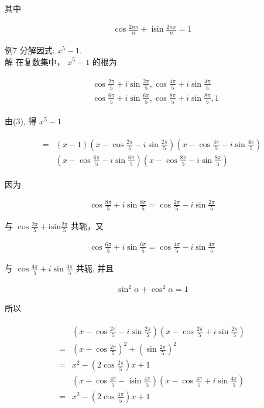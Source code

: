 \documentclass[10pt]{article}
\begin{document}
其中

\begin{align*}
\cos \frac{2 n \pi}{n}+\operatorname{isin} \frac{2 n \pi}{n}=1
\end{align*}

例7 分解因式: $x^{5}-1$.\\
解 在复数集中， $x^{5}-1$ 的根为

\begin{align*}
\begin{aligned}
& \cos \frac{2 \pi}{5}+i \sin \frac{2 \pi}{5}, \cos \frac{4 \pi}{5}+i \sin \frac{4 \pi}{5} \\
& \cos \frac{6 \pi}{5}+i \sin \frac{6 \pi}{5}, \cos \frac{8 \pi}{5}+i \sin \frac{8 \pi}{5}, 1
\end{aligned}
\end{align*}

由(3), 得 $x^{5}-1$

\begin{align*}
\begin{aligned}
= & (x-1)\left(x-\cos \frac{2 \pi}{5}-i \sin \frac{2 \pi}{5}\right)\left(x-\cos \frac{4 \pi}{5}-i \sin \frac{4 \pi}{5}\right) \\
& \left(x-\cos \frac{6 \pi}{5}-i \sin \frac{6 \pi}{5}\right)\left(x-\cos \frac{8 \pi}{5}-i \sin \frac{8 \pi}{5}\right)
\end{aligned}
\end{align*}

因为

\begin{align*}
\cos \frac{8 \pi}{5}+i \sin \frac{8 \pi}{5}=\cos \frac{2 \pi}{5}-i \sin \frac{2 \pi}{5}
\end{align*}

与 $\cos \frac{2 \pi}{5}+\mathrm{isin} \frac{2 \pi}{5}$ 共轭，又

\begin{align*}
\cos \frac{6 \pi}{5}+i \sin \frac{6 \pi}{5}=\cos \frac{4 \pi}{5}-i \sin \frac{4 \pi}{5}
\end{align*}

与 $\cos \frac{4 \pi}{5}+i \sin \frac{4 \pi}{5}$ 共轭, 并且

\begin{align*}
\sin ^{2} \alpha+\cos ^{2} \alpha=1
\end{align*}

所以

\begin{align*}
\begin{aligned}
& \left(x-\cos \frac{2 \pi}{5}-i \sin \frac{2 \pi}{5}\right)\left(x-\cos \frac{2 \pi}{5}+i \sin \frac{2 \pi}{5}\right) \\
= & \left(x-\cos \frac{2 \pi}{5}\right)^{2}+\left(\sin \frac{2 \pi}{5}\right)^{2} \\
= & x^{2}-\left(2 \cos \frac{2 \pi}{5}\right) x+1 \\
& \left(x-\cos \frac{4 \pi}{5}-\operatorname{isin} \frac{4 \pi}{5}\right)\left(x-\cos \frac{4 \pi}{5}+i \sin \frac{4 \pi}{5}\right) \\
= & x^{2}-\left(2 \cos \frac{4 \pi}{5}\right) x+1
\end{aligned}
\end{align*}
\end{document}
